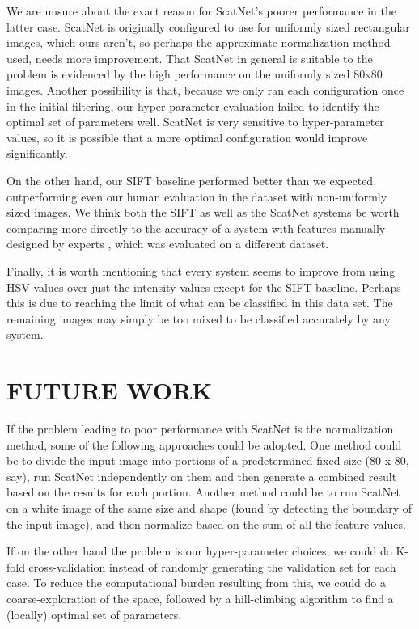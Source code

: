 \documentclass{article}
\begin{document}
We are unsure about the exact reason for ScatNet’s poorer performance in the latter
case. ScatNet is originally configured to use for uniformly sized rectangular images,
which ours aren't, so perhaps the approximate normalization method used, needs more
improvement. That ScatNet in general is suitable to the problem is evidenced by the
high performance on the uniformly sized 80x80 images. Another possibility is that,
because we only ran each configuration once in the initial filtering, our
hyper-parameter evaluation failed to identify the optimal set of parameters well.
ScatNet is very sensitive to hyper-parameter values, so it is possible that a more
optimal configuration would improve significantly. 

On the other hand, our SIFT baseline performed better than we expected, outperforming
even our human evaluation in the dataset with non-uniformly sized images. We think
both the SIFT as well as the ScatNet systems be worth comparing more directly to
the accuracy of a system with features manually designed by experts \cite{Beck2011},
which was evaluated on a different dataset. 

Finally, it is worth mentioning that every system seems to improve from using HSV
values over just the intensity values except for the SIFT baseline. Perhaps this
is due to reaching the limit of what can be classified in this data set. The
remaining images may simply be too mixed to be classified accurately by any system. 

\section{FUTURE WORK}
\label{sec:page}

If the problem leading to poor performance with ScatNet is the normalization method,
some of the following approaches could be adopted. One method could be to divide the input
image into portions of a predetermined fixed size (80 x 80, say), run ScatNet
independently on them and then generate a combined result based on the results
for each portion. Another method could be to run ScatNet on a white image of the
same size and shape (found by detecting the boundary of the input image), and
then normalize based on the sum of all the feature values.

If on the other hand the problem is our hyper-parameter choices, we could do K-fold
cross-validation instead of randomly generating the validation set for each case.
To reduce the computational burden resulting from this, we could do a
coarse-exploration of the space, followed by a hill-climbing algorithm to
find a (locally) optimal set of parameters. 
\end{document}
